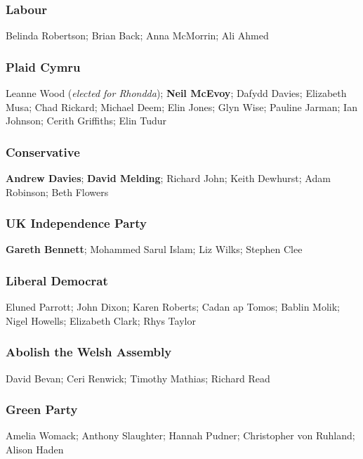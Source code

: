 \begin{resultsiii}
\subsubsection*{Labour}

Belinda Robertson; Brian Back; Anna McMorrin; Ali Ahmed

\subsubsection*{Plaid Cymru}

Leanne Wood (\emph{elected for Rhondda}); \textbf{Neil McEvoy}; Dafydd Davies; Elizabeth Musa; Chad Rickard; Michael Deem; Elin Jones; Glyn Wise; Pauline Jarman; Ian Johnson; Cerith Griffiths; Elin Tudur

\subsubsection*{Conservative}

\textbf{Andrew Davies}; \textbf{David Melding}; Richard John; Keith Dewhurst; Adam Robinson; Beth Flowers

\subsubsection*{UK Independence Party}

\textbf{Gareth Bennett}; Mohammed Sarul Islam; Liz Wilks; Stephen Clee

\subsubsection*{Liberal Democrat}

Eluned Parrott; John Dixon; Karen Roberts; Cadan ap Tomos; Bablin Molik; Nigel Howells; Elizabeth Clark; Rhys Taylor

\subsubsection*{Abolish the Welsh Assembly}

David Bevan; Ceri Renwick; Timothy Mathias; Richard Read

\subsubsection*{Green Party}

Amelia Womack; Anthony Slaughter; Hannah Pudner; Christopher von Ruhland; Alison Haden


\end{resultsiii}
